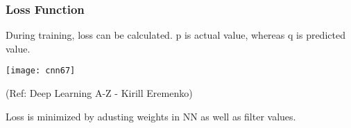 












\begin{frame}[fragile] \frametitle{Loss Function}

During training, loss can be calculated. p is actual value, whereas q is predicted value.

\begin{center}
\texttt{[image: cnn67]}

\tiny{(Ref: Deep Learning A-Z - Kirill Eremenko)}
\end{center}

Loss is minimized by adusting weights in NN as well as filter values.
\end{frame}






